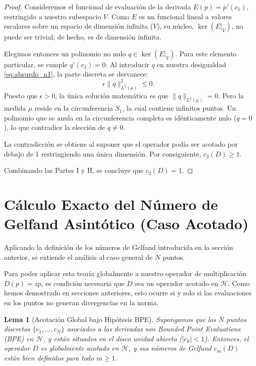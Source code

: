 \documentclass[12pt,a4paper]{article}
\newtheorem{lema}{Lema}
\theoremstyle{definition}
\theoremstyle{remark}
\begin{document}
\begin{proof}
    Consideremos el funcional de evaluación de la derivada $E(p) = p'(c_1)$, restringido a nuestro subespacio $V$. Como $E$ es un funcional lineal a valores escalares sobre un espacio de dimensión infinita ($V$), su núcleo, $\ker(E|_V)$, no puede ser trivial; de hecho, es de dimensión infinita.

    Elegimos entonces un polinomio no nulo $q \in \ker(E|_V)$. Para este elemento particular, se cumple $q'(c_1) = 0$. Al introducir $q$ en nuestra desigualdad \eqref{eq:absurdo_n1}, la parte discreta se desvanece:
    $$ \epsilon \|q\|_{L^2(\mu)}^2 \le 0. $$
    Puesto que $\epsilon > 0$, la única solución matemática es que $\|q\|_{L^2(\mu)} = 0$. Pero la medida $\mu$ reside en la circunferencia $S_1$, la cual contiene infinitos puntos. Un polinomio que se anula en la circunferencia completa es idénticamente nulo ($q=0$), lo que contradice la elección de $q \neq 0$.

    La contradicción se obtiene al suponer que el operador podía ser acotado por debajo de 1 restringiendo una única dimensión. Por consiguiente, $c_2(D) \ge 1$.

    Combinando las Partes I y II, se concluye que $c_2(D) = 1$.
\end{proof}

\section{Cálculo Exacto del Número de Gelfand Asintótico (Caso Acotado)}

Aplicando la definición de los números de Gelfand introducida en la sección anterior, se extiende el análisis al caso general de $N$ puntos.

Para poder aplicar esta teoría globalmente a nuestro operador de multiplicación $D(p) = zp$, es condición necesaria que $D$ sea un operador acotado en $\mathcal{H}$. Como hemos demostrado en secciones anteriores, esto ocurre si y solo si las evaluaciones en los puntos no generan divergencias en la norma.

\begin{lema}[Acotación Global bajo Hipótesis BPE]
    Supongamos que los $N$ puntos discretos $\{c_1, \dots, c_N\}$ asociados a las derivadas son \textit{Bounded Point Evaluations} (BPE) en $\mathcal{H}$, y están situados en el disco unidad abierto ($|c_k| < 1$). Entonces, el operador $D$ es globalmente acotado en $\mathcal{H}$, y sus números de Gelfand $c_m(D)$ están bien definidos para todo $m \ge 1$.
\end{lema}
\end{document}

